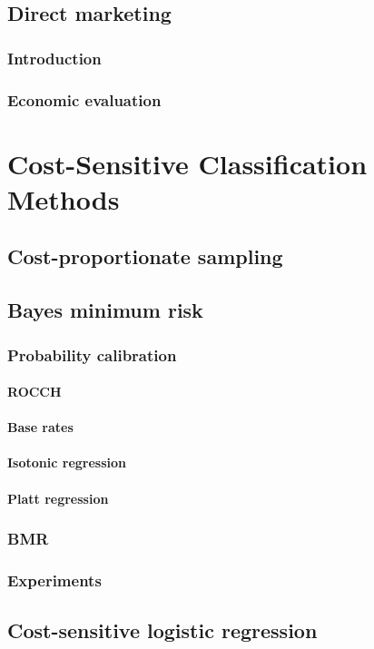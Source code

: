 \documentclass[twoside,openright,titlepage,numbers=noenddot,headinclude,%
               footinclude=true,cleardoublepage=empty,abstractoff,BCOR=5mm,%
               paper=a4,fontsize=11pt,ngerman,american]{scrreprt}
\numberwithin{theorem}{chapter}
\numberwithin{definition}{chapter}
\numberwithin{algorithm}{chapter}
\numberwithin{figure}{chapter}
\numberwithin{table}{chapter}
\numberwithin{equation}{chapter}
\begin{document}
\chapter{Direct marketing}
	\section{Introduction}
	\section{Economic evaluation}

\part{Cost-Sensitive Classification Methods}
\chapter{Cost-proportionate sampling}

\chapter{Bayes minimum risk}
	\section{Probability calibration}
		\subsection{ROCCH}
		\subsection{Base rates}
		\subsection{Isotonic regression}
		\subsection{Platt regression}
	\section{BMR}
	\section{Experiments}
	
\chapter{Cost-sensitive logistic regression}
\end{document}
